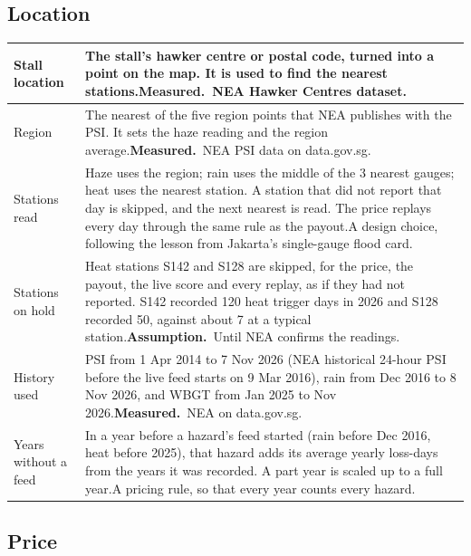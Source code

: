 \documentclass[11pt,a4paper]{article}
\newcommand{\measured}{\textcolor{measured}{\textbf{Measured.}}}
\newcommand{\assumed}{\textcolor{assumed}{\textbf{Assumption.}}}
\begin{document}
\subsection{Location}

{\small
\begin{xltabular}{\textwidth}{|K{3.4cm}|Y|}
\hline
Stall location & The stall's hawker centre or postal code, turned into a point on the map. It is used to find the nearest stations.\newline \measured\ NEA Hawker Centres dataset.\cite{nea-hawker} \\
\hline
Region & The nearest of the five region points that NEA publishes with the PSI. It sets the haze reading and the region average.\newline \measured\ NEA PSI data on data.gov.sg. \\
\hline
Stations read & Haze uses the region; rain uses the middle of the 3 nearest gauges; heat uses the nearest station. A station that did not report that day is skipped, and the next nearest is read. The price replays every day through the same rule as the payout.\newline A design choice, following the lesson from Jakarta's single-gauge flood card. \\
\hline
Stations on hold & Heat stations S142 and S128 are skipped, for the price, the payout, the live score and every replay, as if they had not reported. S142 recorded 120 heat trigger days in 2026 and S128 recorded 50, against about 7 at a typical station.\newline \assumed\ Until NEA confirms the readings. \\
\hline
History used & PSI from 1 Apr 2014 to 7 Nov 2026 (NEA historical 24-hour PSI before the live feed starts on 9 Mar 2016), rain from Dec 2016 to 8 Nov 2026, and WBGT from Jan 2025 to Nov 2026.\newline \measured\ NEA on data.gov.sg.\cite{team-data} \\
\hline
Years without a feed & In a year before a hazard's feed started (rain before Dec 2016, heat before 2025), that hazard adds its average yearly loss-days from the years it was recorded. A part year is scaled up to a full year.\newline A pricing rule, so that every year counts every hazard. \\
\hline
\end{xltabular}}

\subsection{Price}
\end{document}
